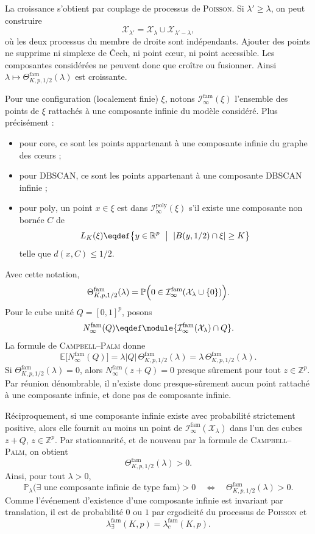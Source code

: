 \begin{Preuve}
La croissance s'obtient par couplage de processus de \textsc{Poisson}.
Si $\lambda'\geq\lambda$, on peut construire
\[
\mathcal X_{\lambda'}=\mathcal X_{\lambda}\cup
\mathcal X_{\lambda'-\lambda},
\]
où les deux processus du membre de droite sont indépendants. Ajouter des points ne supprime ni simplexe de \v{C}ech, ni point cœur, ni point accessible.
Les composantes considérées ne peuvent donc que croître ou fusionner. Ainsi
$\lambda\mapsto\Theta^{\mathrm{fam}}_{K,p,1/2}(\lambda)$ est croissante.

Pour une configuration (localement finie) $\xi$, notons $\mathcal I_{\infty}^{\mathrm{fam}}(\xi)$ l'ensemble des points de $\xi$ rattachés à une composante infinie du modèle considéré. Plus précisément :
\begin{itemize}
    \item pour $\mathrm{core}$, ce sont les points appartenant à une composante infinie du graphe des cœurs ;
    \item pour $\mathrm{DBSCAN}$, ce sont les points appartenant à une composante DBSCAN infinie ;
    \item pour $\mathrm{poly}$, un point $x\in\xi$ est dans $\mathcal I_{\infty}^{\mathrm{poly}}(\xi)$ s'il existe une composante non bornée $C$ de
    \[
    L_K(\xi) \eqdef \bigl\{y\in\mathbb R^p \ \bigm| \ |B(y,1/2)\cap \xi|\geq K\bigr\}
    \]
    telle que $d(x,C)\leq 1/2$.
\end{itemize}
Avec cette notation,
\[
\Theta^{\mathrm{fam}}_{K,p,1/2}(\lambda)
=
\mathbb P\Bigl(
0\in
\mathcal I_{\infty}^{\mathrm{fam}}
(\mathcal X_{\lambda}\cup\{0\})
\Bigr).
\]
Pour le cube unité $Q=[0,1]^p$, posons
\[
N_{\infty}^{\mathrm{fam}}(Q)
\eqdef
\module{
\mathcal I_{\infty}^{\mathrm{fam}}(\mathcal X_{\lambda})
\cap Q
}.
\]
La formule de \textsc{Campbell--Palm} donne
\[
\mathbb E\bigl[N_{\infty}^{\mathrm{fam}}(Q)\bigr]
=
\lambda |Q|\,
\Theta^{\mathrm{fam}}_{K,p,1/2}(\lambda)
=
\lambda\,
\Theta^{\mathrm{fam}}_{K,p,1/2}(\lambda).
\]
Si
$\Theta^{\mathrm{fam}}_{K,p,1/2}(\lambda)=0$, alors
$N_{\infty}^{\mathrm{fam}}(z+Q)=0$ presque sûrement pour tout
$z\in\mathbb Z^p$. Par réunion dénombrable, il n'existe donc presque-sûrement aucun point rattaché à une composante infinie, et donc pas de composante infinie.

Réciproquement, si une composante infinie existe avec probabilité strictement positive, alors elle fournit au moins un point de $\mathcal I_{\infty}^{\mathrm{fam}}(\mathcal X_{\lambda})$ dans l'un des cubes $z+Q$, $z\in\mathbb Z^p$. Par stationnarité, et de nouveau par la formule de \textsc{Campbell--Palm}, on obtient
\[
\Theta^{\mathrm{fam}}_{K,p,1/2}(\lambda)>0.
\]
Ainsi, pour tout $\lambda>0$,
\[
\mathbb P_{\lambda}\bigl(
\exists\text{ une composante infinie de type }\mathrm{fam}
\bigr)>0
\quad\Longleftrightarrow\quad
\Theta^{\mathrm{fam}}_{K,p,1/2}(\lambda)>0.
\]
Comme l'événement d'existence d'une composante infinie est invariant par
translation, il est de probabilité $0$ ou $1$ par ergodicité du processus de \textsc{Poisson} et
\[
\lambda^{\mathrm{fam}}_{\exists}(K,p)
=
\lambda^{\mathrm{fam}}_{c}(K,p).
\]


\end{Preuve}
